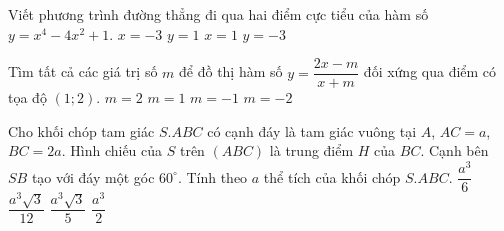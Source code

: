 \begin{ex}%
	Viết phương trình đường thẳng đi qua hai điểm cực tiểu của hàm số $y=x^4-4x^2+1$.
	\choice
	{ $x=-3$}
	{ $y=1$	}
	{ $x=1$}		
	{\True $y=-3$}
\end{ex}
\begin{ex}%
	Tìm tất cả các giá trị số $m$ để đồ thị hàm số $y= \dfrac{2x-m}{x+m}$ đối xứng qua điểm có tọa độ $\left(1;2 \right)$.
	\choice
	{$m=2$}
	{$m=1$}
	{\True $m=-1$}
	{$m=-2$}
\end{ex}
\begin{ex}%
	Cho khối chóp tam giác  $S.ABC$ có cạnh đáy là tam giác vuông tại $A$, $AC=a$, $BC=2a$. Hình chiếu của $S$ trên $(ABC)$ là trung điểm $H$ của $BC$. Cạnh bên $SB$ tạo với đáy một góc $60^\circ$. Tính theo $a$ thể tích của khối chóp $S.ABC$.
	\choice
	{$\dfrac{a^3}{6}$}	
	{$\dfrac{a^3\sqrt{3}}{12}$}
	{$\dfrac{a^3\sqrt{3}}{5}$}
	{\True $\dfrac{a^3}{2}$}
\end{ex}
